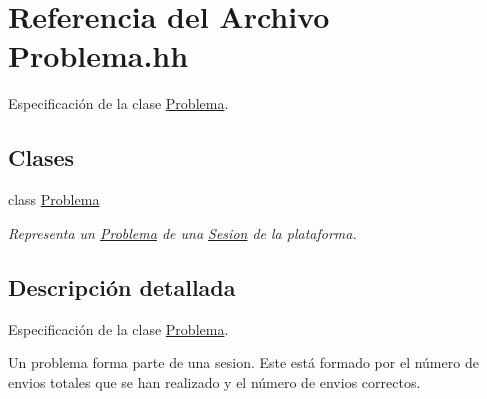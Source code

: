 \hypertarget{_problema_8hh}{}\section{Referencia del Archivo Problema.\+hh}
\label{_problema_8hh}


Especificación de la clase \mbox{\hyperlink{class_problema}{Problema}}.  


\subsection*{Clases}
\begin{DoxyCompactItemize}
\item 
class \mbox{\hyperlink{class_problema}{Problema}}
\begin{DoxyCompactList}\small\item\em Representa un \mbox{\hyperlink{class_problema}{Problema}} de una \mbox{\hyperlink{class_sesion}{Sesion}} de la plataforma. \end{DoxyCompactList}\end{DoxyCompactItemize}


\subsection{Descripción detallada}
Especificación de la clase \mbox{\hyperlink{class_problema}{Problema}}. 

Un problema forma parte de una sesion. Este está formado por el número de envios totales que se han realizado y el número de envios correctos. 